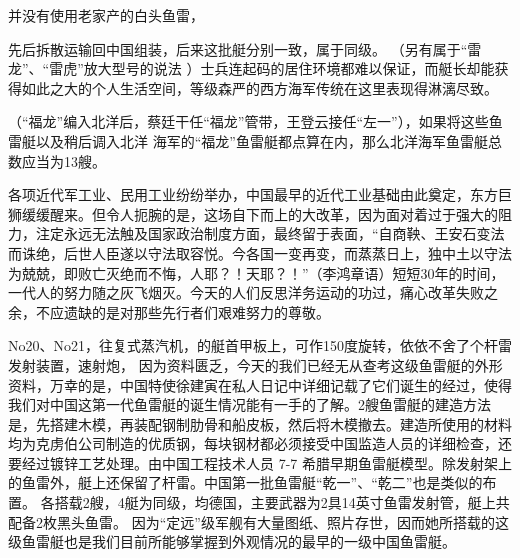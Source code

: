 \documentclass[12pt,UTF8]{ctexbook}
\begin{document}
并没有使用老家产的白头鱼雷， 

先后拆散运输回中国组装，后来这批艇分别一致，属于同级。 （另有属于“雷龙”、“雷虎”放大型号的说法 ）士兵连起码的居住环境都难以保证，而艇长却能获得如此之大的个人生活空间，等级森严的西方海军传统在这里表现得淋漓尽致。

（“福龙”编入北洋后，蔡廷干任“福龙”管带，王登云接任“左一”），如果将这些鱼雷艇以及稍后调入北洋
海军的“福龙”鱼雷艇都点算在内，那么北洋海军鱼雷艇总数应当为13艘。

各项近代军工业、民用工业纷纷举办，中国最早的近代工业基础由此奠定，东方巨狮缓缓醒来。但令人扼腕的是，这场自下而上的大改革，因为面对着过于强大的阻力，注定永远无法触及国家政治制度方面，最终留于表面，“自商鞅、王安石变法而诛绝，后世人臣遂以守法取容悦。今各国一变再变，而蒸蒸日上，独中土以守法为兢兢，即败亡灭绝而不悔，人耶？！天耶？！”（李鸿章语）短短30年的时间，一代人的努力随之灰飞烟灭。今天的人们反思洋务运动的功过，痛心改革失败之余，不应遗缺的是对那些先行者们艰难努力的尊敬。

No20、No21，往复式蒸汽机，的艇首甲板上，可作150度旋转，依依不舍了个杆雷发射装置，速射炮， 因为资料匮乏，今天的我们已经无从查考这级鱼雷艇的外形资料，万幸的是，中国特使徐建寅在私人日记中详细记载了它们诞生的经过，使得我们对中国这第一代鱼雷艇的诞生情况能有一手的了解。2艘鱼雷艇的建造方法是，先搭建木模，再装配钢制肋骨和船皮板，然后将木模撤去。建造所使用的材料均为克虏伯公司制造的优质钢，每块钢材都必须接受中国监造人员的详细检查，还要经过镀锌工艺处理。由中国工程技术人员
7-7
希腊早期鱼雷艇模型。除发射架上的鱼雷外，艇上还保留了杆雷。中国第一批鱼雷艇“乾一”、“乾二”也是类似的布置。
各搭载2艘，4艇为同级，均德国，主要武器为2具14英寸鱼雷发射管，艇上共配备2枚黑头鱼雷。 因为“定远”级军舰有大量图纸、照片存世，因而她所搭载的这级鱼雷艇也是我们目前所能够掌握到外观情况的最早的一级中国鱼雷艇。
\end{document}
